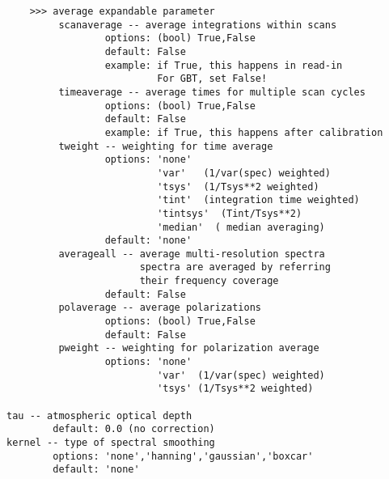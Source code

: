 \begin{verbatim}
    >>> average expandable parameter
         scanaverage -- average integrations within scans
                 options: (bool) True,False
                 default: False
                 example: if True, this happens in read-in
                          For GBT, set False!
         timeaverage -- average times for multiple scan cycles
                 options: (bool) True,False
                 default: False
                 example: if True, this happens after calibration
         tweight -- weighting for time average
                 options: 'none'
                          'var'   (1/var(spec) weighted)
                          'tsys'  (1/Tsys**2 weighted)
                          'tint'  (integration time weighted)
                          'tintsys'  (Tint/Tsys**2)
                          'median'  ( median averaging)
                 default: 'none'
         averageall -- average multi-resolution spectra
                       spectra are averaged by referring 
                       their frequency coverage
                 default: False
         polaverage -- average polarizations
                 options: (bool) True,False
                 default: False
         pweight -- weighting for polarization average
                 options: 'none'
                          'var'  (1/var(spec) weighted)
                          'tsys' (1/Tsys**2 weighted)
                          
tau -- atmospheric optical depth
        default: 0.0 (no correction)
kernel -- type of spectral smoothing
        options: 'none','hanning','gaussian','boxcar'
        default: 'none'
        

\end{verbatim}
